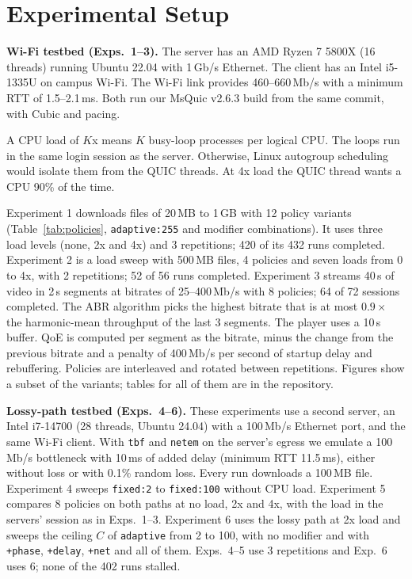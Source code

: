 \documentclass[11pt]{article}
\newcommand{\pol}[1]{\texttt{#1}}            %
\newcommand{\para}[1]{\textbf{#1}} %
\newcommand{\ms}{\,ms}
\newcommand{\mbps}{\,Mb/s}
\begin{document}
\FloatBarrier
\section{Experimental Setup}\label{sec:setup}
\para{Wi-Fi testbed (Exps.~1--3).} The server has an AMD Ryzen 7 5800X (16 threads) running
Ubuntu 22.04 with 1\,Gb/s Ethernet. The client has an Intel i5-1335U on campus Wi-Fi. The Wi-Fi
link provides 460--660\mbps{} with a minimum RTT of 1.5--2.1\ms. Both run our MsQuic v2.6.3 build
from the same commit, with Cubic and pacing.

A CPU load of $K$x means $K$ busy-loop processes per logical CPU. The loops run in the same login
session as the server. Otherwise, Linux autogroup scheduling would isolate them from the QUIC
threads. At 4x load the QUIC thread wants a CPU 90\% of the time.

Experiment 1 downloads files of 20\,MB to 1\,GB with 12 policy variants (Table~\ref{tab:policies},
\pol{adaptive:255} and modifier combinations). It uses three load levels (none, 2x and 4x) and 3
repetitions; 420 of its 432 runs completed. Experiment 2 is a load sweep with 500\,MB files, 4
policies and seven loads from 0 to 4x, with 2 repetitions; 52 of 56 runs completed. Experiment 3
streams 40\,s of video in 2\,s segments at bitrates of 25--400\mbps{} with 8 policies; 64 of 72
sessions completed. The ABR algorithm
picks the highest bitrate that is at most $0.9\times$ the harmonic-mean throughput of the last 3
segments. The player uses a 10\,s buffer. QoE is computed per segment as the bitrate, minus the change
from the previous bitrate and a penalty of 400\mbps{} per second of startup delay and
rebuffering. Policies are interleaved and rotated between repetitions. Figures show a subset of the variants;
tables for all of them are in the repository.

\para{Lossy-path testbed (Exps.~4--6).} These experiments use a second server, an Intel i7-14700
(28 threads, Ubuntu 24.04) with a 100\,Mb/s Ethernet port, and the same Wi-Fi client. With
\pol{tbf} and \pol{netem} on the server's egress we emulate a 100\mbps{} bottleneck with 10\ms{} of
added delay (minimum RTT 11.5\ms), either without loss or with 0.1\% random loss. Every run
downloads a 100\,MB file. Experiment 4 sweeps \pol{fixed:2} to \pol{fixed:100} without CPU load.
Experiment 5 compares 8 policies on both paths at no load, 2x and 4x, with the load in the servers'
session as in Exps.~1--3. Experiment 6 uses the lossy path at 2x load and sweeps the ceiling $C$ of
\pol{adaptive} from 2 to 100, with no modifier and with \pol{+phase}, \pol{+delay}, \pol{+net} and
all of them. Exps.~4--5 use 3 repetitions and Exp.~6 uses 6; none of the 402 runs stalled.
\end{document}
